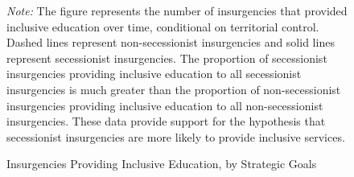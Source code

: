 \documentclass[12pt, letterpaper]{article}
\begin{document}
\newpage
\clearpage
\begin{center}
\begin{figure}[h!]
\renewcommand\thefigure{A.\arabic{figure}}
\begin{center}
\caption{Insurgencies Providing Inclusive Education, by Strategic Goals}
\label{pgedu}
\end{center}
\begin{tablenotes}
\raggedright \footnotesize{\textit{Note:} The figure represents the number of insurgencies that provided inclusive education over time, conditional on territorial control. Dashed lines represent non-secessionist insurgencies and solid lines represent secessionist insurgencies. The proportion of secessionist insurgencies providing inclusive education to all secessionist insurgencies is much greater than the proportion of non-secessionist insurgencies providing inclusive education to all non-secessionist insurgencies. These data provide support for the hypothesis that secessionist insurgencies are more likely to provide inclusive services.} 
\end{tablenotes}
\end{figure}
\end{center}
\end{document}
